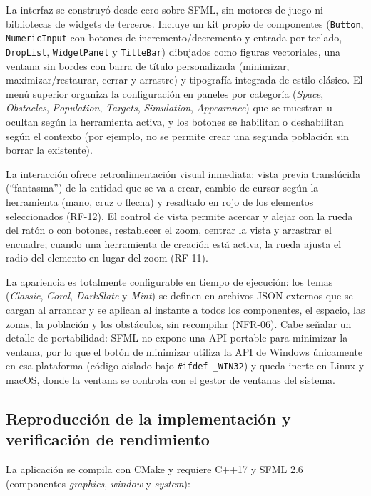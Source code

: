 \documentclass[12pt,a4paper]{article}
\begin{document}
La interfaz se construyó desde cero sobre SFML, sin motores de juego ni bibliotecas de widgets de terceros. Incluye un kit propio de componentes (\texttt{Button}, \texttt{NumericInput} con botones de incremento/decremento y entrada por teclado, \texttt{DropList}, \texttt{WidgetPanel} y \texttt{TitleBar}) dibujados como figuras vectoriales, una ventana sin bordes con barra de título personalizada (minimizar, maximizar/restaurar, cerrar y arrastre) y tipografía integrada de estilo clásico. El menú superior organiza la configuración en paneles por categoría (\emph{Space}, \emph{Obstacles}, \emph{Population}, \emph{Targets}, \emph{Simulation}, \emph{Appearance}) que se muestran u ocultan según la herramienta activa, y los botones se habilitan o deshabilitan según el contexto (por ejemplo, no se permite crear una segunda población sin borrar la existente).

La interacción ofrece retroalimentación visual inmediata: vista previa translúcida (``fantasma'') de la entidad que se va a crear, cambio de cursor según la herramienta (mano, cruz o flecha) y resaltado en rojo de los elementos seleccionados (RF-12). El control de vista permite acercar y alejar con la rueda del ratón o con botones, restablecer el zoom, centrar la vista y arrastrar el encuadre; cuando una herramienta de creación está activa, la rueda ajusta el radio del elemento en lugar del zoom (RF-11).

La apariencia es totalmente configurable en tiempo de ejecución: los temas (\emph{Classic}, \emph{Coral}, \emph{DarkSlate} y \emph{Mint}) se definen en archivos JSON externos que se cargan al arrancar y se aplican al instante a todos los componentes, el espacio, las zonas, la población y los obstáculos, sin recompilar (NFR-06). Cabe señalar un detalle de portabilidad: SFML no expone una API portable para minimizar la ventana, por lo que el botón de minimizar utiliza la API de Windows únicamente en esa plataforma (código aislado bajo \texttt{\#ifdef \_WIN32}) y queda inerte en Linux y macOS, donde la ventana se controla con el gestor de ventanas del sistema.

\subsection{Reproducción de la implementación y verificación de rendimiento}

La aplicación se compila con CMake y requiere C++17 y SFML 2.6 (componentes \emph{graphics}, \emph{window} y \emph{system}):
\end{document}
